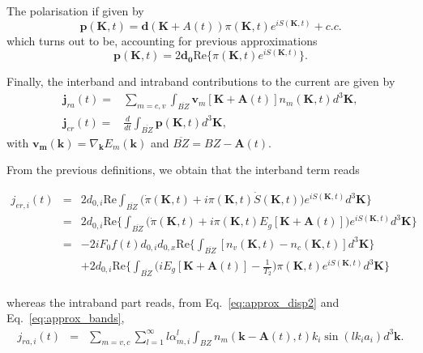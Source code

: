 \documentclass[a4paper,11pt]{report}
\renewcommand{\vec}[1]{\mathbf{#1}}
\begin{document}
The polarisation if given by~\cite{PhysRevLett.113.073901}
\begin{equation}
\vec{p}(\vec{K},t) = \vec{d}(\vec{K}+A(t))\pi(\vec{K},t)e^{iS(\vec{K},t)}+c.c. \nonumber
\end{equation}
which turns out to be, accounting for previous approximations 
\begin{equation}
\vec{p}(\vec{K},t) = 2\vec{d_0}\mathrm{Re}\{\pi(\vec{K},t)e^{iS(\vec{K},t)}\}. \nonumber
\end{equation}

Finally, the interband and intraband contributions to the current are given by
\begin{subequations}
 \begin{align}
  \vec{j}_{ra}(t) =& \sum_{m=c,v} \int_{\overline{BZ}}\vec{v}_m[\vec{K}+\vec{A}(t)] n_m(\vec{K},t)d^3\vec{K},\\
  \vec{j}_{er}(t) =& \frac{d}{dt}\int_{\overline{BZ}} \vec{p}(\vec{K},t)d^3\vec{K},
 \end{align}
\end{subequations}
with $\vec{\vec{v}_m}(\vec{k}) = \nabla_{\vec{k}}E_m(\vec{k})$ and $\overline{BZ}=BZ-\vec{A}(t)$.

From the previous definitions, we obtain that the interband term reads

\begin{eqnarray}
  j_{er,i}(t) &=& 2d_{0,i}\mathrm{Re}\int_{\overline{BZ}}\Bigg(\dot{\pi}(\vec{K},t)+i\pi(\vec{K},t)\dot{S}(\vec{K},t)\Bigg) e^{iS(\vec{K},t)}d^3\vec{K}\} \nonumber\\
   &=& 2d_{0,i}\mathrm{Re}\{\int_{\overline{BZ}}\Bigg(\dot{\pi}(\vec{K},t)+i\pi(\vec{K},t)E_g[\vec{K}+\vec{A}(t)]\Bigg) e^{iS(\vec{K},t)}d^3\vec{K}\} \nonumber\\
%
%
   &=& -2iF_0f(t)d_{0,i} d_{0,x}\mathrm{Re}\{\int_{\overline{BZ}}[n_v(\vec{K},t)-n_c(\vec{K},t)]d^3\vec{K}\} \nonumber\\
   &&+2d_{0,i}\mathrm{Re}\{\int_{\overline{BZ}} \Big(iE_g[\vec{K}+\vec{A}(t)]-\frac{1}{T_2}\Big)\pi(\vec{K},t) e^{iS(\vec{K},t)}d^3\vec{K}\} \nonumber\\
\end{eqnarray}

whereas the intraband part reads, from Eq.~\ref{eq:approx_disp2} and Eq.~\ref{eq:approx_bands},
\begin{eqnarray}
 j_{ra,i}(t) &=& \sum_{m=v,c}\sum_{l=1}^{\infty} l \alpha^{l}_{m,i} \int_{BZ}
   n_m(\vec{k}-\vec{A}(t),t)k_i \sin(lk_ia_i)  d^3\vec{k}.
\end{eqnarray}
\end{document}
